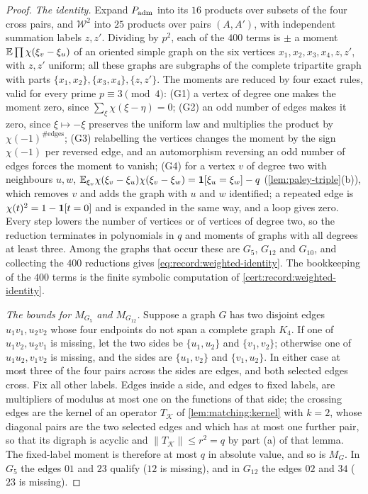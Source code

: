 \begin{proof}
\emph{The identity.} Expand $P_{\rm adm}$ into its $16$ products over subsets
of the four cross pairs, and $\mathcal W^2$ into $25$ products over pairs
$(A,A')$, with independent summation labels $z,z'$. Dividing by $p^2$, each of
the $400$ terms is $\pm$ a moment $\mathbb E\prod\chi(\xi_v-\xi_u)$ of an oriented
simple graph on the six vertices $x_1,x_2,x_3,x_4,z,z'$, with $z,z'$ uniform;
all these graphs are subgraphs of the complete tripartite graph with parts
$\{x_1,x_2\},\{x_3,x_4\},\{z,z'\}$. The moments are reduced by four exact rules,
valid for every prime $p\equiv3\pmod4$:
(G1) a vertex of degree one makes the moment zero, since
$\sum_\xi\chi(\xi-\eta)=0$; (G2) an odd number of edges makes it zero, since
$\xi\mapsto-\xi$ preserves the uniform law and multiplies the product by
$\chi(-1)^{\#\text{edges}}$; (G3) relabelling the vertices changes the moment
by the sign $\chi(-1)$ per reversed edge, and an automorphism reversing an odd
number of edges forces the moment to vanish; (G4) for a vertex $v$ of degree
two with neighbours $u,w$, $\mathbb E_{\xi_v}\chi(\xi_v-\xi_u)\chi(\xi_v-\xi_w)=
\mathbf 1[\xi_u=\xi_w]-q$ (\cref{lem:paley-triple}(b)), which removes $v$ and adds the
graph with $u$ and $w$ identified; a repeated edge is
$\chi(t)^2=1-\mathbf 1[t=0]$ and is expanded in the same way, and a loop gives zero.
Every step lowers the number of vertices or of vertices of degree two, so the
reduction terminates in polynomials in $q$ and moments of graphs with all
degrees at least three. Among the graphs that occur these are $G_5$, $G_{12}$
and $G_{10}$, and collecting the $400$ reductions gives
\eqref{eq:record:weighted-identity}. The bookkeeping of the $400$ terms is the
finite symbolic computation of \cref{cert:record:weighted-identity}.

\emph{The bounds for $M_{G_5}$ and $M_{G_{12}}$.} Suppose a graph $G$ has two
disjoint edges $u_1v_1,u_2v_2$ whose four endpoints do not span a complete
graph $K_4$. If one of $u_1v_2,u_2v_1$ is missing, let the two sides be
$\{u_1,u_2\}$ and $\{v_1,v_2\}$; otherwise one of $u_1u_2,v_1v_2$ is missing,
and the sides are $\{u_1,v_2\}$ and $\{v_1,u_2\}$. In either case at most three
of the four pairs across the sides are edges, and both selected edges cross.
Fix all other labels. Edges inside a side, and edges to fixed labels, are
multipliers of modulus at most one on the functions of that side; the crossing
edges are the kernel of an operator $T_{\mathcal K}$ of \cref{lem:matching:kernel}
with $k=2$, whose diagonal pairs are the two selected edges and which has at
most one further pair, so that its digraph is acyclic and
$\|T_{\mathcal K}\|\le r^2=q$ by part (a) of that lemma. The fixed-label moment
is therefore at most $q$ in absolute value, and so is $M_G$. In $G_5$ the edges
$01$ and $23$ qualify ($12$ is missing), and in $G_{12}$ the edges $02$ and $34$
($23$ is missing).


\end{proof}
